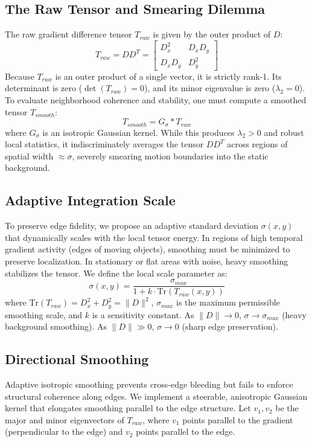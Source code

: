 \documentclass[preprint,12pt]{elsarticle}
\begin{document}
\subsection{The Raw Tensor and Smearing Dilemma}
The raw gradient difference tensor $T_{raw}$ is given by the outer product of $D$:
\begin{equation} \label{eq:raw_tensor}
    T_{raw} = D D^T = \begin{bmatrix} D_x^2 & D_x D_y \\ D_x D_y & D_y^2 \end{bmatrix}
\end{equation}
Because $T_{raw}$ is an outer product of a single vector, it is strictly rank-1. Its determinant is zero ($\det(T_{raw}) = 0$), and its minor eigenvalue is zero ($\lambda_2 = 0$). To evaluate neighborhood coherence and stability, one must compute a smoothed tensor $T_{smooth}$:
\begin{equation} \label{eq:smoothed_tensor}
    T_{smooth} = G_\sigma \ast T_{raw}
\end{equation}
where $G_\sigma$ is an isotropic Gaussian kernel. While this produces $\lambda_2 > 0$ and robust local statistics, it indiscriminately averages the tensor $D D^T$ across regions of spatial width $\approx \sigma$, severely smearing motion boundaries into the static background.

\subsection{Adaptive Integration Scale}
To preserve edge fidelity, we propose an adaptive standard deviation $\sigma(x, y)$ that dynamically scales with the local tensor energy. In regions of high temporal gradient activity (edges of moving objects), smoothing must be minimized to preserve localization. In stationary or flat areas with noise, heavy smoothing stabilizes the tensor.
We define the local scale parameter as:
\begin{equation} \label{eq:adaptive_sigma}
    \sigma(x,y) = \frac{\sigma_{max}}{1 + k \cdot \text{Tr}(T_{raw}(x,y))}
\end{equation}
where $\text{Tr}(T_{raw}) = D_x^2 + D_y^2 = \|D\|^2$, $\sigma_{max}$ is the maximum permissible smoothing scale, and $k$ is a sensitivity constant. As $\|D\| \to 0$, $\sigma \to \sigma_{max}$ (heavy background smoothing). As $\|D\| \gg 0$, $\sigma \to 0$ (sharp edge preservation).

\subsection{Directional Smoothing}
Adaptive isotropic smoothing prevents cross-edge bleeding but fails to enforce structural coherence along edges. We implement a steerable, anisotropic Gaussian kernel that elongates smoothing parallel to the edge structure. Let $v_1, v_2$ be the major and minor eigenvectors of $T_{raw}$, where $v_1$ points parallel to the gradient (perpendicular to the edge) and $v_2$ points parallel to the edge.
\end{document}
